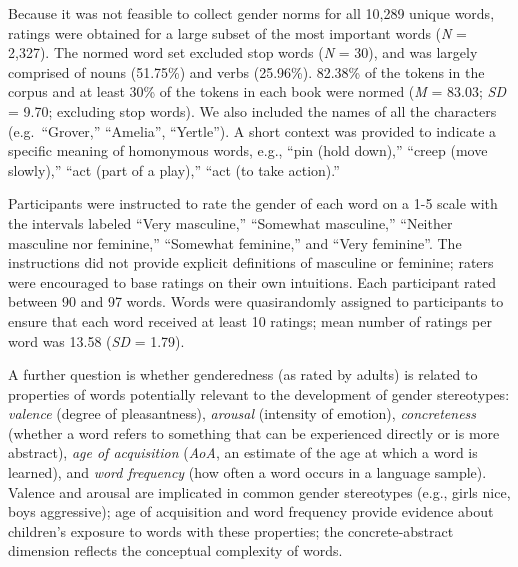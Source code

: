 \documentclass[english,,man,floatsintext]{apa6}
\begin{document}
Because it was not feasible to collect gender norms for all 10,289 unique words, ratings were obtained for a large subset of the most important words (\emph{N} = 2,327). The normed word set excluded stop words (\emph{N} = 30), and was largely comprised of nouns (51.75\%) and verbs (25.96\%). 82.38\% of the tokens in the corpus and at least 30\% of the tokens in each book were normed (\emph{M} = 83.03; \emph{SD} = 9.70; excluding stop words). We also included the names of all the characters (e.g.~\enquote{Grover,} \enquote{Amelia}, \enquote{Yertle}). A short context was provided to indicate a specific meaning of homonymous words, e.g., \enquote{pin (hold down),} \enquote{creep (move slowly),} \enquote{act (part of a play),} \enquote{act (to take action).}

Participants were instructed to rate the gender of each word on a 1-5 scale with the intervals labeled \enquote{Very masculine,} \enquote{Somewhat masculine,} \enquote{Neither masculine nor feminine,} \enquote{Somewhat feminine,} and \enquote{Very feminine}. The instructions did not provide explicit definitions of masculine or feminine; raters were encouraged to base ratings on their own intuitions. Each participant rated between 90 and 97 words. Words were quasirandomly assigned to participants to ensure that each word received at least 10 ratings; mean number of ratings per word was 13.58 (\emph{SD} = 1.79).

A further question is whether genderedness (as rated by adults) is related to properties of words potentially relevant to the development of gender stereotypes: \emph{valence} (degree of pleasantness), \emph{arousal} (intensity of emotion), \emph{concreteness} (whether a word refers to something that can be experienced directly or is more abstract), \emph{age of acquisition} (\emph{AoA}, an estimate of the age at which a word is learned), and \emph{word frequency} (how often a word occurs in a language sample). Valence and arousal are implicated in common gender stereotypes (e.g., girls nice, boys aggressive); age of acquisition and word frequency provide evidence about children's exposure to words with these properties; the concrete-abstract dimension reflects the conceptual complexity of words.
\end{document}
